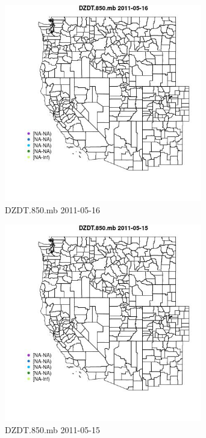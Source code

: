 \clearpage 

\begin{figure} 
\centering  
\includegraphics[width=0.77\textwidth]{Code_Outputs/ML_input_report_ML_input_PM25_Step5_part_d_de_duplicated_aves_ML_input_MapObsDZDT850mb2011-05-16.jpg} 
\caption{\label{fig:ML_input_report_ML_input_PM25_Step5_part_d_de_duplicated_aves_ML_inputMapObsDZDT850mb2011-05-16}DZDT.850.mb 2011-05-16} 
\end{figure} 
 

\begin{figure} 
\centering  
\includegraphics[width=0.77\textwidth]{Code_Outputs/ML_input_report_ML_input_PM25_Step5_part_d_de_duplicated_aves_ML_input_MapObsDZDT850mb2011-05-15.jpg} 
\caption{\label{fig:ML_input_report_ML_input_PM25_Step5_part_d_de_duplicated_aves_ML_inputMapObsDZDT850mb2011-05-15}DZDT.850.mb 2011-05-15} 
\end{figure} 
 

